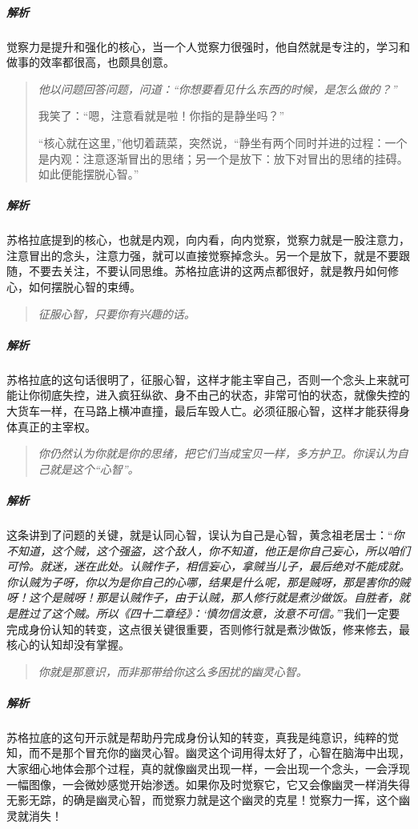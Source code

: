 \subparagraph{解析} 觉察力是提升和强化的核心，当一个人觉察力很强时，他自然就是专注的，学习和做事的效率都很高，也颇具创意。

\begin{quotation}\it
    他以问题回答问题，问道：“你想要看见什么东西的时候，是怎么做的？”

    我笑了：“嗯，注意看就是啦！你指的是静坐吗？”

    “核心就在这里，”他切着蔬菜，突然说，“静坐有两个同时并进的过程：一个是内观：注意逐渐冒出的思绪；另一个是放下：放下对冒出的思绪的挂碍。如此便能摆脱心智。”
\end{quotation}

\subparagraph{解析} 苏格拉底提到的核心，也就是内观，向内看，向内觉察，觉察力就是一股注意力，注意冒出的念头，注意力强，就可以直接觉察掉念头。另一个是放下，就是不要跟随，不要去关注，不要认同思维。苏格拉底讲的这两点都很好，就是教丹如何修心，如何摆脱心智的束缚。

\begin{quote}\it
    征服心智，只要你有兴趣的话。
\end{quote}

\subparagraph{解析} 苏格拉底的这句话很明了，征服心智，这样才能主宰自己，否则一个念头上来就可能让你彻底失控，进入疯狂纵欲、身不由己的状态，非常可怕的状态，就像失控的大货车一样，在马路上横冲直撞，最后车毁人亡。必须征服心智，这样才能获得身体真正的主宰权。

\begin{quote}\it
    你仍然认为你就是你的思绪，把它们当成宝贝一样，多方护卫。你误认为自己就是这个“心智”。
\end{quote}

\subparagraph{解析} 这条讲到了问题的关键，就是认同心智，误认为自己是心智，黄念祖老居士：“\textit{你不知道，这个贼，这个强盗，这个敌人，你不知道，他正是你自己妄心，所以咱们可怜。就迷，迷在此处。认贼作子，相信妄心，拿贼当儿子，最后绝对不能成就。你认贼为子呀，你以为是你自己的心哪，结果是什么呢，那是贼呀，那是害你的贼呀！这个是贼呀！那是认贼作子，由于认贼，那人修行就是煮沙做饭。自胜者，就是胜过了这个贼。所以《四十二章经》：‘慎勿信汝意，汝意不可信。’}”我们一定要完成身份认知的转变，这点很关键很重要，否则修行就是煮沙做饭，修来修去，最核心的认知却没有掌握。

\begin{quote}\it
    你就是那意识，而非那带给你这么多困扰的幽灵心智。
\end{quote}

\subparagraph{解析} 苏格拉底的这句开示就是帮助丹完成身份认知的转变，真我是纯意识，纯粹的觉知，而不是那个冒充你的幽灵心智。幽灵这个词用得太好了，心智在脑海中出现，大家细心地体会那个过程，真的就像幽灵出现一样，一会出现一个念头，一会浮现一幅图像，一会微妙感觉开始渗透。如果你及时觉察它，它又会像幽灵一样消失得无影无踪，的确是幽灵心智，而觉察力就是这个幽灵的克星！觉察力一挥，这个幽灵就消失！

